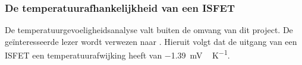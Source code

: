 
\subsubsection{De temperatuurafhankelijkheid van een ISFET}
De temperatuurgevoeligheidsanalyse valt buiten de omvang van dit project. De geïnteresseerde lezer wordt verwezen naar \cite{isfetAsAnElectronicDevice}. Hieruit volgt dat de uitgang van een ISFET een temperatuurafwijking heeft van \qty{-1.39}{\milli\volt\,\kelvin^{-1}}.




